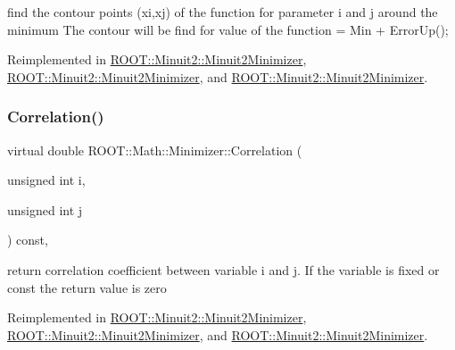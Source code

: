 find the contour points (xi,xj) of the function for parameter i and j around the minimum The contour will be find for value of the function = Min + Error\+Up(); 

Reimplemented in \mbox{\hyperlink{classROOT_1_1Minuit2_1_1Minuit2Minimizer_a026780c27dd4b179817f826f49e36c8e}{R\+O\+O\+T\+::\+Minuit2\+::\+Minuit2\+Minimizer}}, \mbox{\hyperlink{classROOT_1_1Minuit2_1_1Minuit2Minimizer_a026780c27dd4b179817f826f49e36c8e}{R\+O\+O\+T\+::\+Minuit2\+::\+Minuit2\+Minimizer}}, and \mbox{\hyperlink{classROOT_1_1Minuit2_1_1Minuit2Minimizer_a026780c27dd4b179817f826f49e36c8e}{R\+O\+O\+T\+::\+Minuit2\+::\+Minuit2\+Minimizer}}.

\mbox{\label{classROOT_1_1Math_1_1Minimizer_a9ba2f4bc3c8c0e905f2c018e79809c0e}} 
\subsubsection{\texorpdfstring{Correlation()}{Correlation()}\hspace{0.1cm}{\footnotesize\ttfamily [1/3]}}
{\footnotesize\ttfamily virtual double R\+O\+O\+T\+::\+Math\+::\+Minimizer\+::\+Correlation (\begin{DoxyParamCaption}\item[{unsigned int}]{i,  }\item[{unsigned int}]{j }\end{DoxyParamCaption}) const\hspace{0.3cm}{\ttfamily [inline]}, {\ttfamily [virtual]}}

return correlation coefficient between variable i and j. If the variable is fixed or const the return value is zero 

Reimplemented in \mbox{\hyperlink{classROOT_1_1Minuit2_1_1Minuit2Minimizer_a229e82025189e72b5a03cb4e3be19f4a}{R\+O\+O\+T\+::\+Minuit2\+::\+Minuit2\+Minimizer}}, \mbox{\hyperlink{classROOT_1_1Minuit2_1_1Minuit2Minimizer_a229e82025189e72b5a03cb4e3be19f4a}{R\+O\+O\+T\+::\+Minuit2\+::\+Minuit2\+Minimizer}}, and \mbox{\hyperlink{classROOT_1_1Minuit2_1_1Minuit2Minimizer_a229e82025189e72b5a03cb4e3be19f4a}{R\+O\+O\+T\+::\+Minuit2\+::\+Minuit2\+Minimizer}}.

